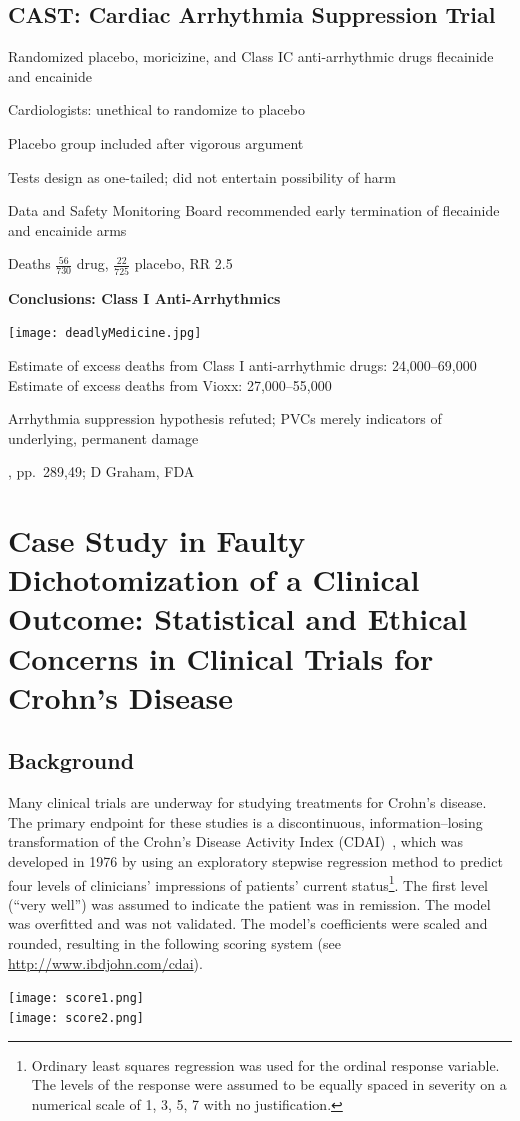 \subsection{CAST: Cardiac Arrhythmia Suppression Trial}
\bi
\item Randomized placebo, moricizine, and Class IC anti-arrhythmic
drugs flecainide and encainide
\item Cardiologists: unethical to randomize to placebo
\item Placebo group included after vigorous argument
\item Tests design as one-tailed; did not entertain possibility of
harm
\item Data and Safety Monitoring Board recommended early termination
of flecainide and encainide arms
\item Deaths $\frac{56}{730}$ drug, $\frac{22}{725}$ placebo, RR 2.5
\ei
\citet{car89pre}

\textbf{Conclusions: Class I Anti-Arrhythmics}

\centerline{\texttt{[image: deadlyMedicine.jpg]}}

Estimate of excess deaths from Class I anti-arrhythmic drugs: 24,000--69,000\\
Estimate of excess deaths from Vioxx: 27,000--55,000

Arrhythmia suppression hypothesis refuted; PVCs merely indicators of
underlying, permanent damage

\citet{moo95dea}, pp.~289,49; D Graham, FDA

\section{Case Study in Faulty Dichotomization of a Clinical Outcome: Statistical and Ethical Concerns in Clinical Trials for
  Crohn's Disease}

\subsection{Background}
Many clinical trials are underway for studying treatments for Crohn's disease.
The primary endpoint for these studies is a
discontinuous, information--losing transformation of the Crohn's
Disease Activity Index
(CDAI)~\cite{bes76dev}, which  was developed in 1976 by
using an exploratory stepwise regression method to predict four levels
of clinicians' impressions of patients' current
status\footnote{Ordinary least squares regression was used for the
  ordinal response variable.  The levels of the response were assumed
  to be equally spaced in severity on a numerical
  scale of 1, 3, 5, 7 with no justification.}.  The first
level (``very well'') was assumed to indicate the patient was in
remission.  The model was overfitted and was not validated.  The
model's coefficients were scaled and rounded, resulting in the
following scoring system (see \url{http://www.ibdjohn.com/cdai}).
\clearpage
\begin{center}
\texttt{[image: score1.png]}\\
\texttt{[image: score2.png]}
\end{center}

